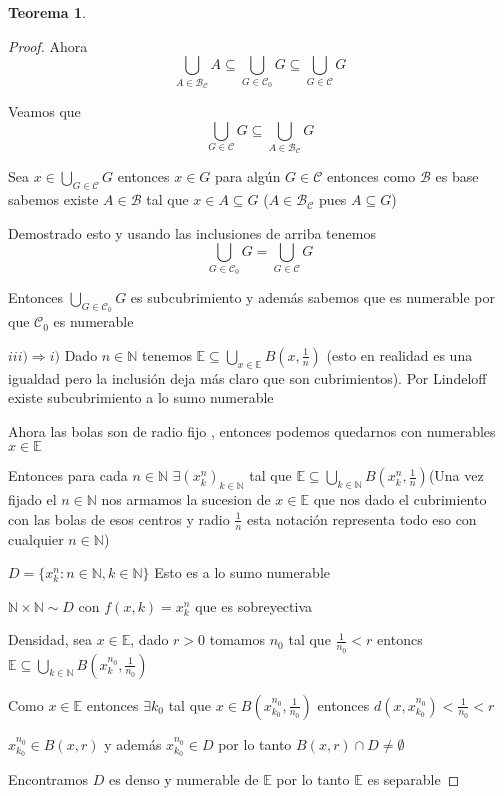 \documentclass[12pt]{article}
\newcommand{\E}{\mathbb{E}}
\newcommand{\N}{\mathbb{N}}
\newcommand{\Ra}{\Rightarrow}
\theoremstyle{definition}
\newtheorem{theorem}{Teorema}
\begin{document}
\begin{theorem}
\begin{proof}
Ahora $$\bigcup_{A \in \mathcal{B}_{\mathcal{C}}}A \subseteq \bigcup_{G \in \mathcal{C}_0} G \subseteq \bigcup_{G \in \mathcal{C}} G  $$

Veamos que $$\bigcup_{G \in \mathcal{C}} G \subseteq  \bigcup_{A \in \mathcal{B}_{\mathcal{C}} } G$$

Sea $x \in \bigcup_{G \in \mathcal{C}} G$ entonces $ x \in G$ para algún $G \in \mathcal{C}$ entonces como $\mathcal{B}$ es base sabemos existe $A \in \mathcal{B}$ tal que $x \in A \subseteq G$ ($A \in \mathcal{B}_{\mathcal{C}}$ pues $A \subseteq G$)

Demostrado esto y usando las inclusiones de arriba tenemos 
$$ \bigcup_{G \in \mathcal{C}_0} G = \bigcup_{G \in \mathcal{C}} G$$

Entonces $\bigcup_{G \in \mathcal{C}_0} G$ es subcubrimiento y además sabemos que es numerable por que $\mathcal{C}_0$ es numerable

$iii) \Ra i)$ Dado $n \in \N$ tenemos $\E \subseteq \bigcup_{x \in \E} B(x, \frac{1}{n})$ (esto en realidad es una igualdad pero la inclusión deja más claro que son cubrimientos). Por Lindeloff existe subcubrimiento a lo sumo numerable 

Ahora las bolas son de radio fijo , entonces podemos quedarnos con numerables $x \in \E$

Entonces para cada $n \in \N$ $\exists (x_k^n)_{k \in \N}$ tal que $\E \subseteq \bigcup_{k \in \N} B(x_k^n,\frac{1}{n})$(Una vez fijado el $n \in \N$ nos armamos la sucesion de $x \in \E$ que nos dado el cubrimiento con las bolas de esos centros y radio $\frac{1}{n}$ esta notación representa todo eso con cualquier $n \in \N$)

$D = \{x_k^n : n \in \N, k \in \N \}$ Esto es a lo sumo numerable 

$ \N \times \N \sim D $ con $f(x,k) = x_k^n$ que es sobreyectiva

Densidad, sea $x \in \E$, dado $r>0$ tomamos $n_0$ tal que $\frac{1}{n_0} < r$ entoncs $\E \subseteq \bigcup_{k \in \N}B(x_k^{n_0},\frac{1}{n_0})$

Como $x \in \E$ entonces $\exists k_0$ tal que $x \in B(x_{k_0}^{n_0},\frac{1}{n_0})$ entonces $d(x,x_{k_0}^{n_0}) < \frac{1}{n_0} < r$

$x_{k_0}^{n_0} \in B(x,r) $ y además $x_{k_0}^{n_0} \in D$ por lo tanto $B(x,r) \cap D \neq \emptyset$

Encontramos $D$ es denso y numerable de $\E$ por lo tanto $\E$ es separable

\end{proof}
\end{theorem}
\end{document}
